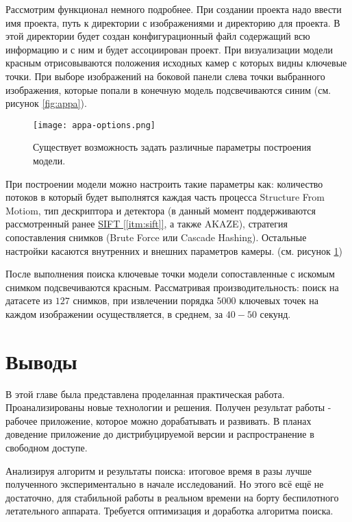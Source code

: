 Рассмотрим функционал немного подробнее. При создании проекта надо ввести имя проекта, путь к директории с изображениями и директорию для проекта. В этой директории будет создан конфигурационный файл содержащий всю информацию и с ним и будет ассоциирован проект. При визуализации модели красным отрисовываются положения исходных камер с которых видны ключевые точки. При выборе изображений на боковой панели слева точки выбранного изображения, которые попали в конечную модель подсвечиваются синим (см. рисунок \ref{fig:appa}).

\begin{figure}[h]
    \centering
    \texttt{[image: appa-options.png]}
    \caption{Существует возможность задать различные параметры построения модели.}
    \label{fig:appa-options}
\end{figure}

При построении модели можно настроить такие параметры как: количество потоков в который будет выполнятся каждая часть процесса Structure From Motiom, тип дескриптора и детектора (в данный момент поддерживаются рассмотренный ранее \hyperref[itm:sift]{SIFT [\ref{itm:sift}]}, а также AKAZE), стратегия сопоставления снимков (Brute Force или Cascade Hashing). Остальные настройки касаются внутренних и внешних параметров камеры. (см. рисунок \ref{fig:appa-options})

После выполнения поиска ключевые точки модели сопоставленные с искомым снимком подсвечиваются красным. Рассматривая производительность: поиск на датасете из $127$ снимков, при извлечении порядка $5000$ ключевых точек на каждом изображении осуществляется, в среднем, за $40-50$ секунд.

\section{Выводы}

В этой главе была представлена проделанная практическая работа. Проанализированы новые технологии и решения. Получен результат работы - рабочее приложение, которое можно дорабатывать и развивать. В планах доведение приложение до дистрибуцируемой версии и распространение в свободном доступе.

Анализируя алгоритм и результаты поиска: итоговое время в разы лучше полученного экспериментально в начале исследований. Но этого всё ещё не достаточно, для стабильной работы в реальном времени на борту беспилотного летательного аппарата. Требуется оптимизация и доработка алгоритма поиска.